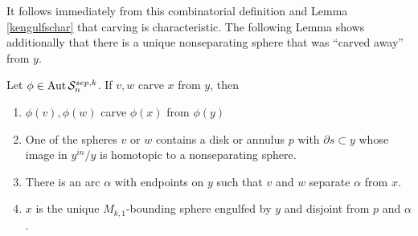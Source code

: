 It follows immediately from this combinatorial definition and
Lemma \ref{kengulfschar} that carving is characteristic.
The following Lemma shows additionally that there is
a unique nonseparating sphere that was
``carved away'' from $y$.


\begin{lemma}
  Let $\phi \in \operatorname{Aut} \mathcal S^{sep,k}_{n}$.
  If $v,w$ carve $x$ from $y$,
  then
  \begin{enumerate}[(1)]
  \item $\phi(v), \phi(w)$ carve $\phi(x)$ from $\phi(y)$
  \item One of the spheres $v$ or $w$
  contains a disk or annulus $p$ with $\partial s \subset y$ whose image in $y^{in}/y$
  is homotopic to a nonseparating sphere.
  \item There is an arc $\alpha$ with endpoints on $y$
  such that $v$ and $w$ separate $\alpha$ from $x$.
  \item $x$ is the unique $M_{k,1}$-bounding sphere engulfed by $y$ and disjoint from $p$ and $\alpha$.
\end{enumerate}
\label{carvingchar}
\end{lemma}

